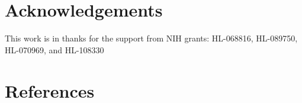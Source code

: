 \documentclass[review]{elsarticle}
\begin{document}











\section*{Acknowledgements}
This work is in thanks for the support from NIH grants: 
  HL-068816, HL-089750, HL-070969, and HL-108330 

\newpage


\newpage
\section*{References}


\end{document}
